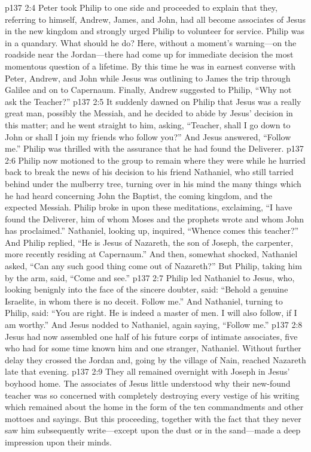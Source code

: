 \vs p137 2:4 Peter took Philip to one side and proceeded to explain that they, referring to himself, Andrew, James, and John, had all become associates of Jesus in the new kingdom and strongly urged Philip to volunteer for service. Philip was in a quandary. What should he do? Here, without a moment’s warning---on the roadside near the Jordan---there had come up for immediate decision the most momentous question of a lifetime. By this time he was in earnest converse with Peter, Andrew, and John while Jesus was outlining to James the trip through Galilee and on to Capernaum. Finally, Andrew suggested to Philip, “Why not ask the Teacher?”\plusone
\vs p137 2:5 It suddenly dawned on Philip that Jesus was a really great man, possibly the Messiah, and he decided to abide by Jesus’ decision in this matter; and he went straight to him, asking, “Teacher, shall I go down to John or shall I join my friends who follow you?” And Jesus answered, \textcolor{ubdarkred}{“Follow me.”} Philip was thrilled with the assurance that he had found the Deliverer.
\pc \vs p137 2:6 Philip now motioned to the group to remain where they were while he hurried back to break the news of his decision to his friend Nathaniel, who still tarried behind under the mulberry tree, turning over in his mind the many things which he had heard concerning John the Baptist, the coming kingdom, and the expected Messiah. Philip broke in upon these meditations, exclaiming, “I have found the Deliverer, him of whom Moses and the prophets wrote and whom John has proclaimed.” Nathaniel, looking up, inquired, “Whence comes this teacher?” And Philip replied, “He is Jesus of Nazareth, the son of Joseph, the carpenter, more recently residing at Capernaum.” And then, somewhat shocked, Nathaniel asked, “Can any such good thing come out of Nazareth?” But Philip, taking him by the arm, said, “Come and see.”
\vs p137 2:7 Philip led Nathaniel to Jesus, who, looking benignly into the face of the sincere doubter, said: \textcolor{ubdarkred}{“Behold a genuine Israelite, in whom there is no deceit. Follow me.”} And Nathaniel, turning to Philip, said: “You are right. He is indeed a master of men. I will also follow, if I am worthy.” And Jesus nodded to Nathaniel, again saying, \textcolor{ubdarkred}{“Follow me.”}\plusone
\pc \vs p137 2:8 Jesus had now assembled one half of his future corps of intimate associates, five who had for some time known him and one stranger, Nathaniel. Without further delay they crossed the Jordan and, going by the village of Nain, reached Nazareth late that evening.
\vs p137 2:9 They all remained overnight with Joseph in Jesus’ boyhood home. The associates of Jesus little understood why their new\hyp{}found teacher was so concerned with completely destroying every vestige of his writing which remained about the home in the form of the ten commandments and other mottoes and sayings. But this proceeding, together with the fact that they never saw him subsequently write---except upon the dust or in the sand---made a deep impression upon their minds.
